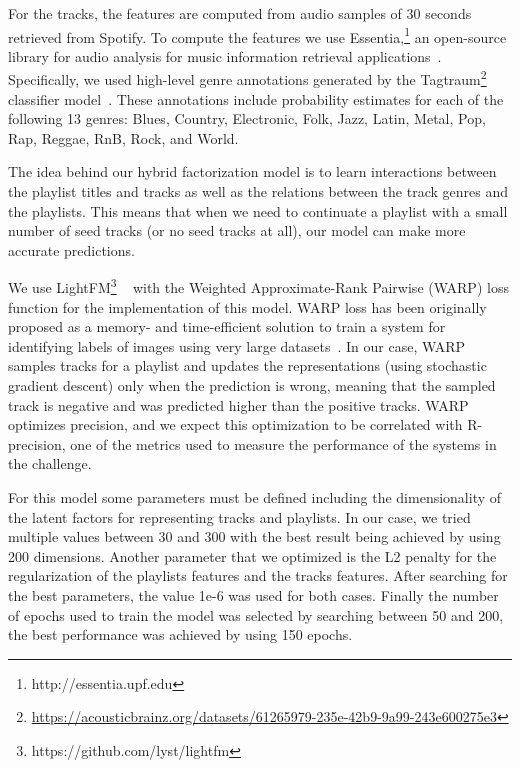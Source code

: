 For the tracks, the features are computed from audio samples of 30 seconds retrieved from Spotify. To compute the features we use Essentia,\footnote{http://essentia.upf.edu} an open-source library for audio analysis for music information retrieval applications~\cite{bogdanov2013essentia}. Specifically, we used high-level genre annotations generated by the Tagtraum\footnote{\url{https://acousticbrainz.org/datasets/61265979-235e-42b9-9a99-243e600275e3}} classifier model~\cite{bogdanov2016cross}. These annotations include probability estimates for each of the following 13 genres: Blues, Country, Electronic, Folk, Jazz, Latin, Metal, Pop, Rap, Reggae, RnB, Rock, and World. 

The idea behind our hybrid factorization model is to learn interactions between the playlist titles and tracks as well as the relations between the track genres and the playlists. This means that when we need to continuate a playlist with a small number of seed tracks (or no seed tracks at all), our model can make more accurate predictions.

We use LightFM\footnote{https://github.com/lyst/lightfm} ~\cite{kula2015metadata} with the Weighted Approximate-Rank Pairwise (WARP) loss function for the implementation of this model. %
WARP loss has been originally proposed as a memory- and time-efficient solution to train a system for identifying labels of images using very large datasets~\cite{bonnin2015automated}.  In our case, WARP samples tracks for a playlist and updates the representations (using stochastic gradient descent) only when the prediction is wrong, meaning  that the sampled track is negative and was predicted higher than the positive tracks. WARP optimizes precision, %
and we expect this optimization to be correlated with R-precision, one of the metrics used to measure the performance of the systems in the challenge.

For this model some parameters must be defined including the dimensionality of the latent factors for representing tracks and playlists. In our case, we tried multiple values between 30 and 300 with the best result being achieved by using 200 dimensions. Another parameter that we optimized is the L2 penalty for the regularization of the playlists features and the tracks features. After searching for the best parameters, the value 1e-6 was used for both cases. Finally the number of epochs used to train the model was selected by searching between 50 and 200, the best performance was achieved by using 150 epochs.


